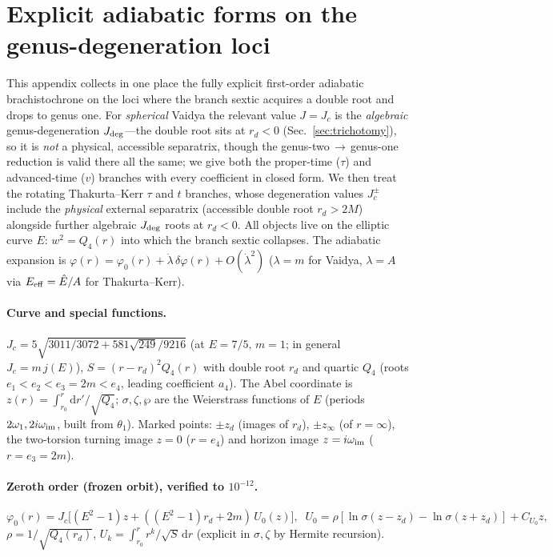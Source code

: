 \documentclass[12pt]{iopart}
\newcommand{\Ehat}{\hat E}
\newcommand{\Jc}{J_{c}}
\newcommand{\dd}{\mathrm{d}}
\begin{document}
\section{Explicit adiabatic forms on the genus-degeneration loci}
\label{app:separatrix}
This appendix collects in one place the fully explicit first-order adiabatic
brachistochrone on the loci where the branch sextic acquires a double root and drops to
genus one. For \emph{spherical} Vaidya the relevant value $J=\Jc$ is the \emph{algebraic}
genus-degeneration $J_{\rm deg}$---the double root sits at $r_d<0$
(Sec.~\ref{sec:trichotomy}), so it is \emph{not} a physical, accessible separatrix,
though the genus-two$\,\to\,$genus-one reduction is valid there all the same; we give both
the proper-time ($\tau$) and advanced-time ($v$) branches with every coefficient in closed
form. We then treat the rotating Thakurta--Kerr $\tau$ and $t$ branches, whose degeneration
values $\Jc^\pm$ include the \emph{physical} external separatrix (accessible double root
$r_d>2M$) alongside further algebraic $J_{\rm deg}$ roots at $r_d<0$. All objects live on
the elliptic curve $E:\,w^2=Q_4(r)$ into which the branch sextic collapses. The adiabatic expansion is
$\varphi(r)=\varphi_0(r)+\dot\lambda\,\delta\varphi(r)+O(\dot\lambda^2)$
($\lambda=m$ for Vaidya, $\lambda=A$ via $E_{\rm eff}=\Ehat/A$ for Thakurta--Kerr).

\paragraph{Curve and special functions.}
$\Jc=5\sqrt{3011/3072+581\sqrt{249}/9216}$ (at $E=7/5,\,m=1$; in general $\Jc=m\,j(E)$),
$S=(r-r_d)^2Q_4(r)$ with double root $r_d$ and quartic $Q_4$ (roots
$e_1<e_2<e_3=2m<e_4$, leading coefficient $a_4$). The Abel coordinate is
$z(r)=\int_{r_0}^r\dd r'/\sqrt{Q_4}$; $\sigma,\zeta,\wp$ are the Weierstrass functions
of $E$ (periods $2\omega_1,2i\omega_{\rm im}$, built from $\theta_1$). Marked points:
$\pm z_d$ (images of $r_d$), $\pm z_\infty$ (of $r=\infty$), the two-torsion turning
image $z=0$ ($r=e_4$) and horizon image $z=i\omega_{\rm im}$ ($r=e_3=2m$).

\paragraph{Zeroth order (frozen orbit), verified to $10^{-12}$.}
\begin{equation}
\varphi_0(r)=\Jc\big[(E^2-1)z+((E^2-1)r_d+2m)\,U_0(z)\big],\;\;
U_0=\rho[\ln\sigma(z{-}z_d)-\ln\sigma(z{+}z_d)]+C_{U_0}z,
\end{equation}
$\rho=1/\sqrt{Q_4(r_d)}$, $U_k=\int_{r_0}^r r^k/\sqrt S\,\dd r$ (explicit in
$\sigma,\zeta$ by Hermite recursion).
\end{document}
